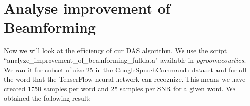\documentclass[11pt,a4paper,titlepage]{report}
\begin{document}
\section{Analyse improvement of Beamforming}
\hspace*{0.6cm}
Now we will look at the efficiency of our DAS algorithm. We use the script ``analyze\_improvement\_of\_beamforming\_fulldata" available in \textit{pyroomacoustics}. We ran it for subset of size 25 in the GoogleSpeechCommands dataset and for all the word that the TenserFlow neural network can recognize. This means we have created 1750 samples per word and 25 samples per SNR for a given word. We obtained the following result:\\
\end{document}
